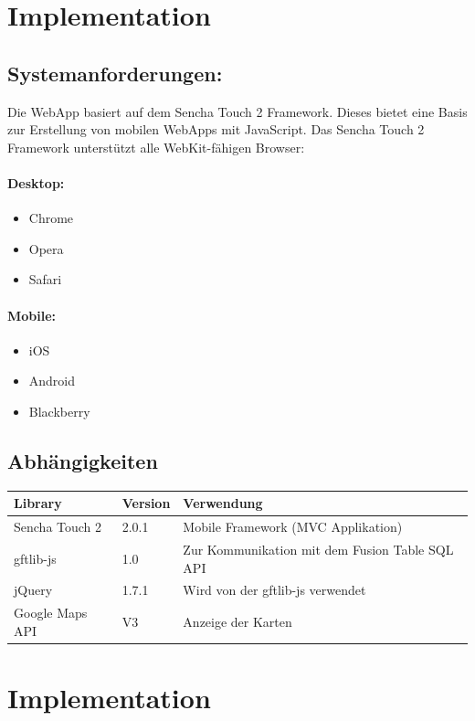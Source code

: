 \section{Implementation}
\subsection{Systemanforderungen:}
Die WebApp basiert auf dem Sencha Touch 2 Framework. Dieses bietet eine Basis zur Erstellung von mobilen WebApps mit JavaScript. Das Sencha Touch 2 Framework unterstützt alle WebKit-fähigen Browser:

\paragraph{Desktop:}
\begin{itemize}
\item Chrome
\item Opera
\item Safari
\end{itemize}

\paragraph{Mobile:}
\begin{itemize}
\item iOS
\item Android
\item Blackberry
\end{itemize}

\subsection{Abhängigkeiten}
\begin{longtable}{|l|l|p{10cm}|}
\hline 
\textbf{Library} & \textbf{Version} & \textbf{Verwendung} \\ 
\hline 
Sencha Touch 2 & 2.0.1 & Mobile Framework (MVC Applikation) \\ 
\hline 
gftlib-js & 1.0 & Zur Kommunikation mit dem Fusion Table SQL API \\ 
\hline 
jQuery & 1.7.1 & Wird von der gftlib-js verwendet \\ 
\hline 
Google Maps API & V3 & Anzeige der Karten \\ 
\hline 
\end{longtable} 

\section{Implementation}
